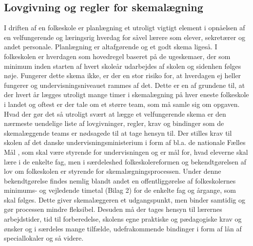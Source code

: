 \subsection{Lovgivning og regler for skemalægning}
\label{Lovgivning og regler}
I driften af en folkeskole er planlægning et utroligt vigtigt element i opnåelsen af en velfungerende og læringsrig hverdag for såvel lærere som elever, sekretærer og andet personale. Planlægning er altafgørende og et godt skema ligeså. I folkeskolen er hverdagen som hovedregel baseret på de ugeskemaer, der som minimum inden starten af hvert skoleår udarbejdes af skolen og sidenhen følges nøje. Fungerer dette skema ikke, er der en stor risiko for, at hverdagen ej heller fungerer og undervisningsniveauet rammes af det.
Dette er en af grundene til, at der hvert år lægges utroligt mange timer i skemalægning på hver eneste folkeskole i landet og oftest er der tale om et større team, som må samle sig om opgaven. Hvad der gør det så utroligt svært at lægge et velfungerende skema er den nærmeste uendelige liste af lovgivninger, regler, krav og bindinger som de skemalæggende teams er nødsagede til at tage hensyn til.  Der stilles krav til skolen af det danske undervisningsministerium i form af bl.a. de nationale Fælles Mål \cite{fmaal}, som skal være styrende for undervisningen og er mål for, hvad eleverne skal lære i de enkelte fag, men i særdeleshed folkeskolereformen og bekendtgørelsen af lov om folkeskolen \cite{Lovgivning} er styrende for skemalægningsprocessen. Under denne bekendtgørelse findes nemlig blandt andet en offentliggørelse af folkeskolernes minimums- og vejledende timetal (Bilag 2) for de enkelte fag og årgange, som skal følges. Dette giver skemalæggeren et udgangspunkt, men binder samtidig og gør processen mindre fleksibel. Desuden må der tages hensyn til lærernes arbejdstider, tid til forberedelse, skolens egne praktiske og pædagogiske krav og ønsker og i særdeles mange tilfælde, udefrakommende bindinger i form af lån af speciallokaler og så videre.

